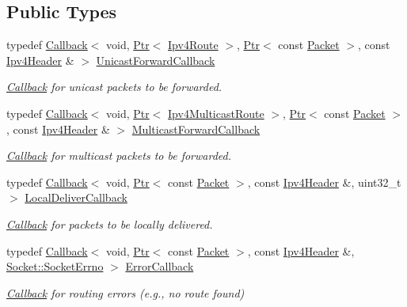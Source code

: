 \subsection*{Public Types}
\begin{DoxyCompactItemize}
\item 
typedef \hyperlink{classns3_1_1Callback}{Callback}$<$ void, \hyperlink{classns3_1_1Ptr}{Ptr}$<$ \hyperlink{classns3_1_1Ipv4Route}{Ipv4\+Route} $>$, \hyperlink{classns3_1_1Ptr}{Ptr}$<$ const \hyperlink{classns3_1_1Packet}{Packet} $>$, const \hyperlink{classns3_1_1Ipv4Header}{Ipv4\+Header} \& $>$ \hyperlink{classns3_1_1Ipv4RoutingProtocol_a3453a85764cbbb1e704da7e919aa5d19}{Unicast\+Forward\+Callback}
\begin{DoxyCompactList}\small\item\em \hyperlink{classns3_1_1Callback}{Callback} for unicast packets to be forwarded. \end{DoxyCompactList}\item 
typedef \hyperlink{classns3_1_1Callback}{Callback}$<$ void, \hyperlink{classns3_1_1Ptr}{Ptr}$<$ \hyperlink{classns3_1_1Ipv4MulticastRoute}{Ipv4\+Multicast\+Route} $>$, \hyperlink{classns3_1_1Ptr}{Ptr}$<$ const \hyperlink{classns3_1_1Packet}{Packet} $>$, const \hyperlink{classns3_1_1Ipv4Header}{Ipv4\+Header} \& $>$ \hyperlink{classns3_1_1Ipv4RoutingProtocol_a26e76f7a555462e6c08fceda64a99d58}{Multicast\+Forward\+Callback}
\begin{DoxyCompactList}\small\item\em \hyperlink{classns3_1_1Callback}{Callback} for multicast packets to be forwarded. \end{DoxyCompactList}\item 
typedef \hyperlink{classns3_1_1Callback}{Callback}$<$ void, \hyperlink{classns3_1_1Ptr}{Ptr}$<$ const \hyperlink{classns3_1_1Packet}{Packet} $>$, const \hyperlink{classns3_1_1Ipv4Header}{Ipv4\+Header} \&, uint32\+\_\+t $>$ \hyperlink{classns3_1_1Ipv4RoutingProtocol_aa6ffa0159cb143daa3c46d2ba69bb1b9}{Local\+Deliver\+Callback}
\begin{DoxyCompactList}\small\item\em \hyperlink{classns3_1_1Callback}{Callback} for packets to be locally delivered. \end{DoxyCompactList}\item 
typedef \hyperlink{classns3_1_1Callback}{Callback}$<$ void, \hyperlink{classns3_1_1Ptr}{Ptr}$<$ const \hyperlink{classns3_1_1Packet}{Packet} $>$, const \hyperlink{classns3_1_1Ipv4Header}{Ipv4\+Header} \&, \hyperlink{classns3_1_1Socket_ada1328c5ae0c28cb2a982caf8f6d6cca}{Socket\+::\+Socket\+Errno} $>$ \hyperlink{classns3_1_1Ipv4RoutingProtocol_a0348285418c30d5021b08f7a68af21ea}{Error\+Callback}
\begin{DoxyCompactList}\small\item\em \hyperlink{classns3_1_1Callback}{Callback} for routing errors (e.\+g., no route found) \end{DoxyCompactList}\end{DoxyCompactItemize}

